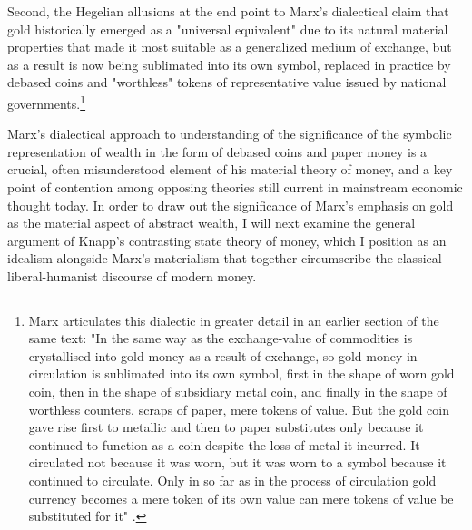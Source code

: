 Second, the Hegelian allusions at the end point to Marx's dialectical claim that gold historically emerged as a "universal equivalent" due to its natural material properties that made it most suitable as a generalized medium of exchange, but as a result is now being sublimated into its own symbol, replaced in practice by debased coins and "worthless" tokens of representative value issued by national governments.\footnote{
  Marx articulates this dialectic in greater detail in an earlier section of the same text: "In the same way as the exchange-value of commodities is crystallised into gold money as a result of exchange, so gold money in circulation is sublimated into its own symbol, first in the shape of worn gold coin, then in the shape of subsidiary metal coin, and finally in the shape of worthless counters, scraps of paper, mere tokens of value. But the gold coin gave rise first to metallic and then to paper substitutes only because it continued to function as a coin despite the loss of metal it incurred. It circulated not because it was worn, but it was worn to a symbol because it continued to circulate. Only in so far as in the process of circulation gold currency becomes a mere token of its own value can mere tokens of value be substituted for it" \autocite[ch.~2.2.c]{MarxCPE}.
}

Marx's dialectical approach to understanding of the significance of the symbolic representation of wealth in the form of debased coins and paper money is a crucial, often misunderstood element of his material theory of money, and a key point of contention among opposing theories still current in mainstream economic thought today. In order to draw out the significance of Marx's emphasis on gold as the material aspect of abstract wealth, I will next examine the general argument of Knapp's contrasting state theory of money, which I position as an idealism alongside Marx's materialism that together circumscribe the classical liberal-humanist discourse of modern money.

